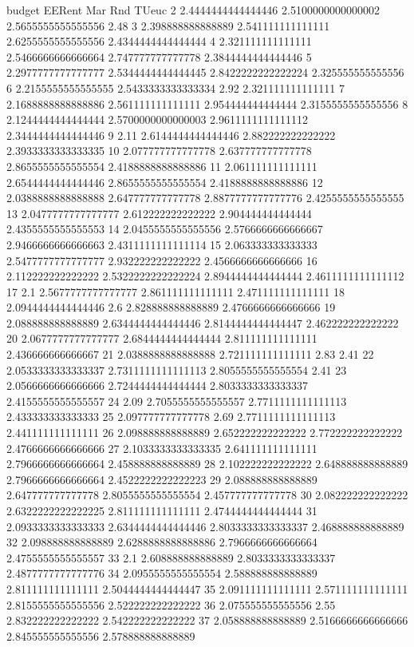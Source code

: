 budget EERent Mar Rnd TUeuc
2 2.4444444444444446 2.5100000000000002 2.5655555555555556 2.48
3 2.398888888888889 2.541111111111111 2.6255555555555556 2.4344444444444444
4 2.321111111111111 2.5466666666666664 2.747777777777778 2.3844444444444446
5 2.2977777777777777 2.5344444444444445 2.8422222222222224 2.325555555555556
6 2.2155555555555555 2.5433333333333334 2.92 2.321111111111111
7 2.1688888888888886 2.561111111111111 2.954444444444444 2.3155555555555556
8 2.1244444444444444 2.5700000000000003 2.9611111111111112 2.3444444444444446
9 2.11 2.6144444444444446 2.882222222222222 2.3933333333333335
10 2.077777777777778 2.637777777777778 2.8655555555555554 2.4188888888888886
11 2.061111111111111 2.6544444444444446 2.8655555555555554 2.4188888888888886
12 2.0388888888888888 2.647777777777778 2.8877777777777776 2.4255555555555555
13 2.0477777777777777 2.612222222222222 2.904444444444444 2.4355555555555553
14 2.0455555555555556 2.5766666666666667 2.9466666666666663 2.4311111111111114
15 2.063333333333333 2.5477777777777777 2.932222222222222 2.4566666666666666
16 2.112222222222222 2.5322222222222224 2.8944444444444444 2.4611111111111112
17 2.1 2.5677777777777777 2.861111111111111 2.471111111111111
18 2.0944444444444446 2.6 2.828888888888889 2.4766666666666666
19 2.088888888888889 2.6344444444444446 2.8144444444444447 2.462222222222222
20 2.0677777777777777 2.6844444444444444 2.811111111111111 2.436666666666667
21 2.0388888888888888 2.721111111111111 2.83 2.41
22 2.0533333333333337 2.7311111111111113 2.8055555555555554 2.41
23 2.0566666666666666 2.7244444444444444 2.8033333333333337 2.4155555555555557
24 2.09 2.7055555555555557 2.7711111111111113 2.433333333333333
25 2.097777777777778 2.69 2.7711111111111113 2.441111111111111
26 2.098888888888889 2.652222222222222 2.772222222222222 2.4766666666666666
27 2.1033333333333335 2.641111111111111 2.7966666666666664 2.458888888888889
28 2.102222222222222 2.648888888888889 2.7966666666666664 2.4522222222222223
29 2.088888888888889 2.647777777777778 2.8055555555555554 2.457777777777778
30 2.082222222222222 2.6322222222222225 2.811111111111111 2.4744444444444444
31 2.0933333333333333 2.6344444444444446 2.8033333333333337 2.468888888888889
32 2.098888888888889 2.6288888888888886 2.7966666666666664 2.4755555555555557
33 2.1 2.608888888888889 2.8033333333333337 2.4877777777777776
34 2.0955555555555554 2.588888888888889 2.811111111111111 2.5044444444444447
35 2.091111111111111 2.571111111111111 2.8155555555555556 2.522222222222222
36 2.075555555555556 2.55 2.832222222222222 2.542222222222222
37 2.058888888888889 2.5166666666666666 2.845555555555556 2.578888888888889
